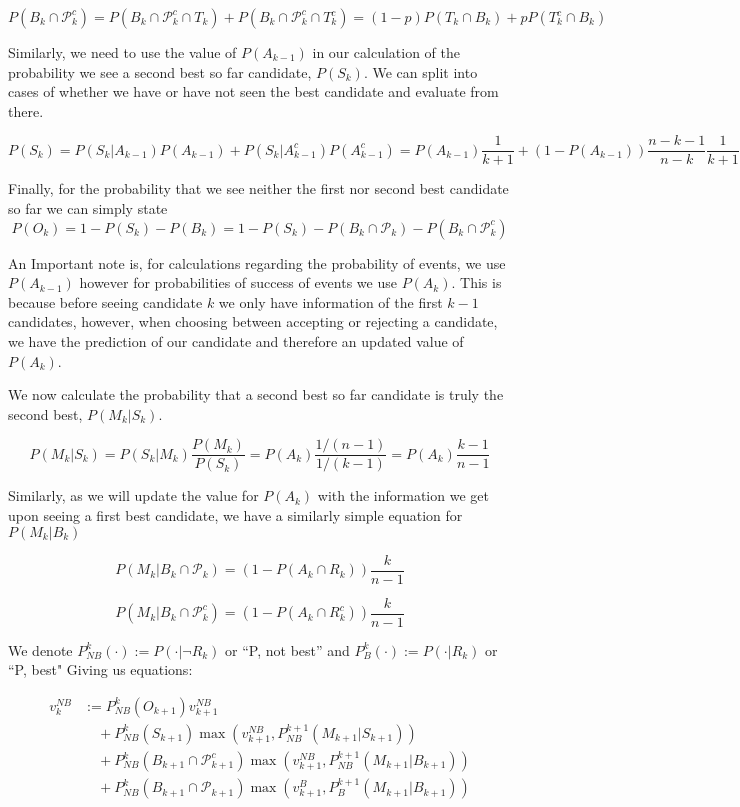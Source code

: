 \documentclass[a4paper,11pt]{article}
\begin{document}
$$
P(B_k \cap \mathcal{P}_k^c) = P(B_k \cap \mathcal{P}_k^c \cap T_k) + P(B_k \cap \mathcal{P}_k^c \cap T_k^c) = (1-p)P(T_k\cap B_k) + pP(T_k^c\cap B_k)
$$

Similarly, we need to use the value of $P(A_{k-1})$ in our calculation of the probability we see a second best so far candidate, $P(S_k)$. We can split into cases of whether we have or have not seen the best candidate and evaluate from there.

$$
P(S_k) = P(S_k|A_{k-1})P(A_{k-1})+P(S_k|A_{k-1}^c)P(A_{k-1}^c) =  P(A_{k-1})\frac{1}{k+1}+ (1-P(A_{k-1}))\frac{n-k-1}{n-k}\frac{1}{k+1}
$$

Finally, for the probability that we see neither the first nor second best candidate so far we can simply state
$$
P(O_k) = 1- P(S_k) - P(B_k) = 1 - P(S_k)-P(B_k \cap \mathcal{P}_k) - P(B_k \cap \mathcal{P}_k^c)
$$

An Important note is, for calculations regarding the probability of events, we use $P(A_{k-1})$ however for probabilities of success of events we use $P(A_k)$. This is because before seeing candidate $k$ we only have information of the first $k-1$ candidates, however, when choosing between accepting or rejecting a candidate, we have the prediction of our candidate and therefore an updated value of $P(A_k)$.

We now calculate the probability that a second best so far candidate is truly the second best, $P(M_k|S_k)$.

$$
P(M_k|S_k) = P(S_k|M_k)\frac{P(M_k)}{P(S_k)}=P(A_k)\frac{1/(n-1)}{1/(k-1)} = P(A_k)\frac{k-1}{n-1}
$$

Similarly, as we will update the value for $P(A_k)$ with the information we get upon seeing a first best candidate, we have a similarly simple equation for $P(M_k|B_k)$

$$
P(M_k|B_k\cap \mathcal{P}_k) = (1-P(A_k\cap R_k))\frac{k}{n-1}
$$

$$
P(M_k |B_k\cap\mathcal{P}_k^c) = (1-P(A_k\cap R_k^c))\frac{k}{n-1}
$$


We denote $P_{NB}^k(\cdot) := P(\cdot | \neg R_k)$ or ``P, not best''  and $P_{B}^k(\cdot) := P(\cdot | R_k)$ or ``P, best"
Giving us equations:

\begin{align*}
v_k^{NB} &:= P_{NB}^k(O_{k+1}) v_{k+1}^{NB} \\
      &\quad + P_{NB}^k(S_{k+1})\max\left(v_{k+1}^{NB},P_{NB}^{k+1}(M_{k+1}|S_{k+1})\right) \\
      &\quad + P_{NB}^k(B_{k+1} \cap \mathcal{P}_{k+1}^c)\max\left(v_{k+1}^{NB},P_{NB}^{k+1}(M_{k+1}|B_{k+1})\right) \\
      &\quad + P_{NB}^k(B_{k+1} \cap \mathcal{P}_{k+1})\max\left(v_{k+1}^{B},P_{B}^{k+1}(M_{k+1}|B_{k+1})\right)
\end{align*}
\end{document}
